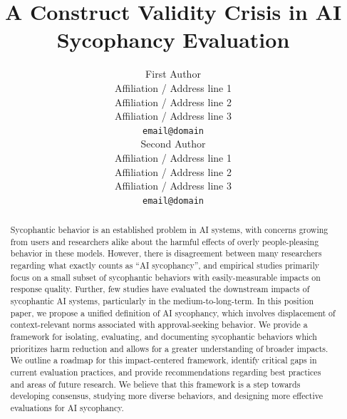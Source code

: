 \documentclass[11pt]{article}
\title{A Construct Validity Crisis in AI Sycophancy Evaluation}
\author{First Author \\
  Affiliation / Address line 1 \\
  Affiliation / Address line 2 \\
  Affiliation / Address line 3 \\
  \texttt{email@domain} \\\And
  Second Author \\
  Affiliation / Address line 1 \\
  Affiliation / Address line 2 \\
  Affiliation / Address line 3 \\
  \texttt{email@domain} \\}
\begin{document}
\maketitle
\begin{abstract}
Sycophantic behavior is an established problem in AI systems, with concerns growing from users and researchers alike about the harmful effects of overly people-pleasing behavior in these models. However, there is disagreement between many researchers regarding what exactly counts as ``AI sycophancy'', and empirical studies primarily focus on a small subset of sycophantic behaviors with easily-measurable impacts on response quality. Further, few studies have evaluated the downstream impacts of sycophantic AI systems, particularly in the medium-to-long-term. In this position paper, we propose a unified definition of AI sycophancy, which involves displacement of context-relevant norms associated with approval-seeking behavior. We provide a framework for isolating, evaluating, and documenting sycophantic behaviors which prioritizes harm reduction and allows for a greater understanding of broader impacts. We outline a roadmap for this impact-centered framework, identify critical gaps in current evaluation practices, and provide recommendations regarding best practices and areas of future research. We believe that this framework is a step towards developing consensus, studying more diverse behaviors, and designing more effective evaluations for AI sycophancy.
\end{abstract}







\end{document}
